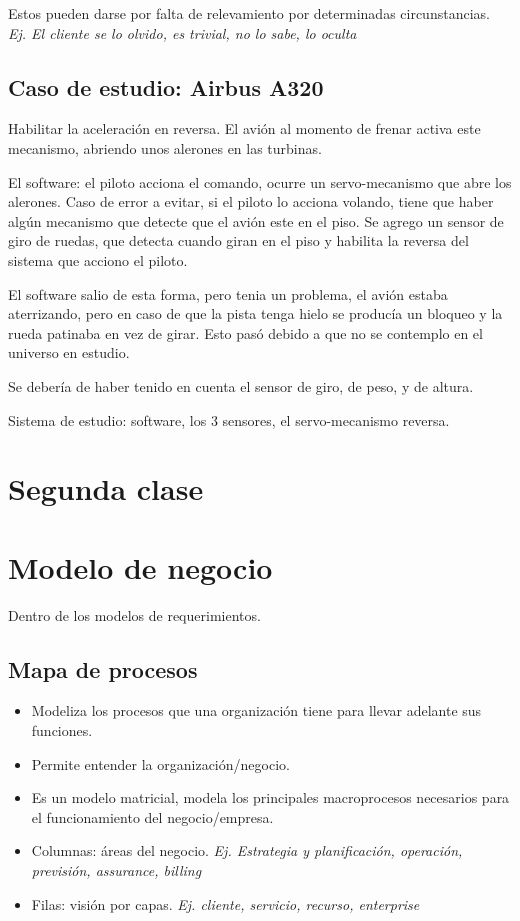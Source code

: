 \documentclass[titlepage,a4paper]{article}
\begin{document}
Estos pueden darse por falta de relevamiento por determinadas circunstancias. \textit{Ej. El cliente se lo olvido, es trivial, no lo sabe, lo oculta}

\subsection{Caso de estudio: Airbus A320}

Habilitar la aceleración en reversa. El avión al momento de frenar activa este mecanismo, abriendo unos alerones en las turbinas.

El software: el piloto acciona el comando, ocurre un servo-mecanismo que abre los alerones. Caso de error a evitar, si el piloto lo acciona volando, tiene que haber algún mecanismo que detecte que el avión este en el piso. Se agrego un sensor de giro de ruedas, que detecta cuando giran en el piso y habilita la reversa del sistema que acciono el piloto.

El software salio de esta forma, pero tenia un problema, el avión estaba aterrizando, pero en caso de que la pista tenga hielo se producía un bloqueo y la rueda patinaba en vez de girar. Esto pasó debido a que no se contemplo en el universo en estudio.

Se debería de haber tenido en cuenta el sensor de giro, de peso, y de altura.

Sistema de estudio: software, los 3 sensores, el servo-mecanismo reversa.

\newpage
\section*{Segunda clase}
\section{Modelo de negocio}
Dentro de los modelos de requerimientos.
\subsection{Mapa de procesos}
    \begin{itemize}
        \item Modeliza los procesos que una organización tiene para llevar adelante sus funciones.
        \item Permite entender la organización/negocio.
        \item Es un modelo matricial, modela los principales macroprocesos necesarios para el funcionamiento del negocio/empresa.
        \item Columnas: áreas del negocio. \textit{Ej. Estrategia y planificación, operación, previsión, assurance, billing}
        \item Filas: visión por capas. \textit{Ej. cliente, servicio, recurso, enterprise}
    \end{itemize}
    
\end{document}

